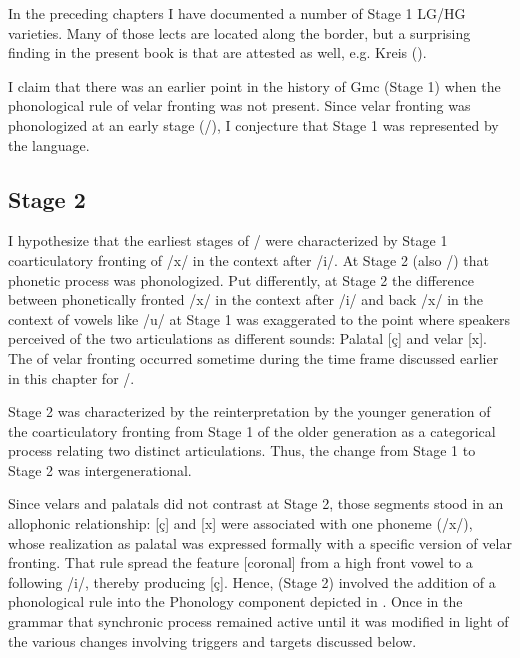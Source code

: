   In the preceding chapters I have documented a number of Stage 1 LG\slash HG varieties. Many of those lects are located along the  border, but a surprising finding in the present book is that  are attested as well, e.g. Kreis  ().

  I claim that there was an earlier point in the history of Gmc (Stage 1) when the phonological rule of velar fronting was not present. Since velar fronting was phonologized at an early stage (/), I conjecture that Stage 1 was represented by the  language.

\subsection{Stage 2} 
  I hypothesize that the earliest stages of / were characterized by Stage 1 coarticulatory fronting of /x/ in the context after /i/. At Stage 2 (also /) that  phonetic process was phonologized. Put differently, at Stage 2 the difference between phonetically fronted /x/ in the context after /i/ and back /x/ in the context of vowels like /u/ at Stage 1 was exaggerated to the point where speakers perceived of the two articulations as different sounds: Palatal [ç] and velar [x]. The  of velar fronting occurred sometime during the time frame discussed earlier in this chapter for /.

  Stage 2 was characterized by the reinterpretation by the younger generation of the  coarticulatory fronting from Stage 1 of the older generation as a categorical process relating two distinct articulations. Thus, the change from Stage 1 to Stage 2 was intergenerational.

  Since velars and palatals did not contrast at Stage 2, those segments stood in an allophonic relationship: [ç] and [x] were associated with one phoneme (/x/), whose realization as palatal was expressed formally with a specific version of velar fronting. That rule spread the feature [coronal] from a high front vowel to a following /i/, thereby producing [ç]. Hence,  (Stage 2) involved the addition of a phonological rule into the Phonology component depicted in . Once in the grammar that synchronic process remained active until it was modified in light of the various changes involving triggers and targets discussed below.

